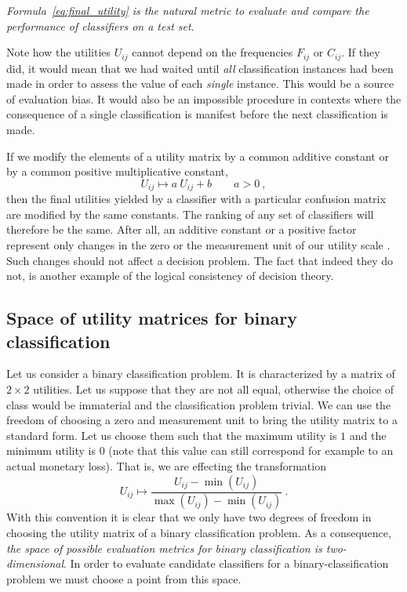 \documentclass[\ifafour a4paper,12pt,\else a5paper,10pt,\fi%
onecolumn,oneside,article,%
british%
]{memoir}
\theoremstyle{remark}
\theoremstyle{innote}
\renewcommand*{\|}[1][]{\nonscript\:#1\vert\nonscript\:\mathopen{}}
\newcommand*{\sect}{\S}%
\begin{document}
\emph{Formula~\eqref{eq:final_utility} is the natural metric to evaluate and compare the performance of classifiers on a test set}.

Note how the utilities $U_{ij}$ cannot depend on the frequencies $F_{ij}$ or $C_{ij}$. If they did, it would mean that we had waited until \emph{all} classification instances had been made in order to assess the value of each \emph{single} instance. This would be a source of evaluation bias. It would also be an impossible procedure in contexts where the consequence of a single classification is manifest before the next classification is made.

If we modify the elements of a utility matrix by a common additive constant or by a common positive multiplicative constant,
\begin{equation}
  \label{eq:modify_UM}
  U_{ij} \mapsto a\ U_{ij} + b  \qquad a > 0 \ ,
\end{equation}
then the final utilities yielded by a classifier with a particular confusion matrix are modified by the same constants. The ranking of any set of classifiers will therefore be the same. After all, an additive constant or a positive factor represent only changes in the zero or the measurement unit of our utility scale \autocites[cf.][\sect~15.2.2]{russelletal1995_r2022}. Such changes should not affect a decision problem. The fact that indeed they do not, is another example of the logical consistency of decision theory.

\subsection{Space of utility matrices for binary classification}
\label{sec:dt_space_util}

Let us consider a binary classification problem. It is characterized by a matrix of $2\times2$ utilities. Let us suppose that they are not all equal, otherwise the choice of class would be immaterial and the classification problem trivial. We can use the freedom of choosing a zero and measurement unit to bring the utility matrix to a standard form. Let us choose them such that the maximum utility is $1$ and  the minimum utility is $0$ (note that this value can still correspond for example to an actual monetary loss). That is, we are effecting the transformation
\begin{equation}
  \label{eq:normalize_utilities}
  U_{ij} \mapsto \frac{U_{ij} - \min(U_{ij})}{\max(U_{ij}) - \min(U_{ij})} \ .
\end{equation}
With this convention it is clear that we only have two degrees of freedom in choosing the utility matrix of a binary classification problem. As a consequence, \emph{the space of possible evaluation metrics for binary classification is two-dimensional}. In order to evaluate candidate classifiers for a binary-classification problem we must choose a point from this space.
\end{document}
